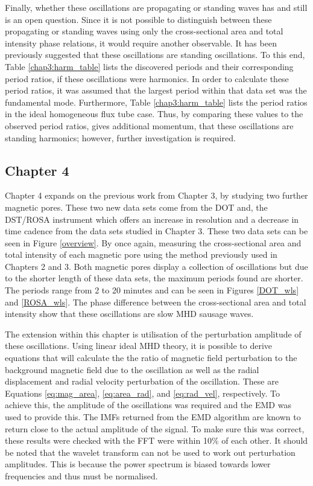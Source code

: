     Finally, whether these oscillations are propagating or standing waves has and still is an open question. 
    Since it is not possible to distinguish between these propagating or standing waves using only the cross-sectional area and total intensity phase relations, it would require another observable.
    It has been previously suggested that these oscillations are standing oscillations.
    To this end, Table \ref{chap3:harm_table} lists the discovered periods and their corresponding period ratios, if these oscillations were harmonics.
    In order to calculate these period ratios, it was assumed that the largest period within that data set was the fundamental mode. 
    Furthermore, Table \ref{chap3:harm_table} lists the period ratios in the ideal homogeneous flux tube case.       
    Thus, by comparing these values to the observed period ratios, gives additional momentum, that these oscillations are standing harmonics; however, further investigation is required.
    
    \subsection{Chapter 4}
    	
    Chapter 4 expands on the previous work from Chapter 3, by studying two further magnetic pores.
    These two new data sets come from the DOT and, the DST/ROSA instrument which offers an increase in resolution and a decrease in time cadence from the data sets studied in Chapter 3.
    These two data sets can be seen in Figure \ref{overview}.
    By once again, measuring the cross-sectional area and total intensity of each magnetic pore using the method previously used in Chapters 2 and 3. 
    Both magnetic pores display a collection of oscillations but due to the shorter length of these data sets, the maximum periods found are shorter.
    The periods range from 2 to 20 minutes and can be seen in Figures \ref{DOT_wls} and \ref{ROSA_wls}.     
    The phase difference between the cross-sectional area and total intensity show that these oscillations are slow MHD sausage waves.
    
    The extension within this chapter is utilisation of the perturbation amplitude of these oscillations.
    Using linear ideal MHD theory, it is possible to derive equations that will calculate the the ratio of magnetic field perturbation to the background magnetic field due to the oscillation as well as the radial displacement and radial velocity perturbation of the oscillation.
    These are Equations \ref{eq:mag_area}, \ref{eq:area_rad}, and \ref{eq:rad_vel}, respectively. 
    To achieve this, the amplitude of the oscillations was required and the EMD was used to provide this.
    The IMFs returned from the EMD algorithm are known to return close to the actual amplitude of the signal.
    To make sure this was correct, these results were checked with the FFT were within 10\% of each other.
	It should be noted that the wavelet transform can not be used to work out perturbation amplitudes.
	This is because the power spectrum is biased towards lower frequencies and thus must be normalised.
  
